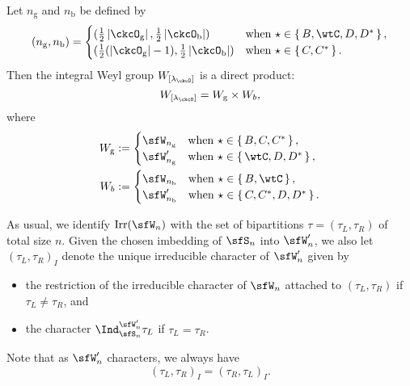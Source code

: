 \documentclass[12pt,a4paper]{amsart}
\def\abs#1{\left|{#1}\right|}
\newcommand{\g}{\mathfrak g}
\numberwithin{equation}{section}
\theoremstyle{remark}
\def\half{{\tfrac{1}{2}}}
\def\Irr{\mathrm{Irr}}
\def\lamck{\lambda_\ckcO}
\def\WLamck{W_{[\lambda_{\ckcO}]}}
\def\Wb{W_{b}}
\def\Wg{W_{\mathrm g}}
\begin{document}
Let $n_{\mathrm g}$ and $n_{\mathrm b}$ be defined by
  \begin{equation*}%
    (n_{\mathrm g},n_{\mathrm b}) =
    \begin{cases}
      (\half\abs{\ckcO_{\mathrm g}}, \half \abs{\ckcO_{\mathrm b}}) & \text{when
      } \star \in \set{B,\wtC,D,D^{*}},\\
      (\half(\abs{\ckcO_{\mathrm g}}-1), \half \abs{\ckcO_{\mathrm b}}) & \text{when
      } \star \in \set{C,C^{*}}.\\
          \end{cases}
  \end{equation*}
 Then the integral Weyl group $\WLamck$ is a direct product:
    \[
    W_{[\lamck]} =\Wg\times \Wb,
  \]
  where
  \begin{equation}\label{eq:Wbg}
    \begin{split}
    \Wg & := \begin{cases}
      \sfW_{n_{\mathrm g}}  & \text{when } \star \in \set{B,C, C^{*} }, \\
      \sfW'_{n_{\mathrm g}} & \text{when } \star \in \set{\wtC,D,D^{*}},\end{cases}\\
      \Wb & := \begin{cases}
      \sfW_{n_{\mathrm b}}  & \text{when } \star \in \set{B, \wtC}, \\
      \sfW'_{n_{\mathrm b}} & \text{when } \star \in \set{C,C^{*},D,D^{*}}.
      \end{cases}
    \end{split}
  \end{equation}

As usual, we identify $\Irr(\sfW_{n})$ with the set of bipartitions $\tau =(\tau_{L},\tau_{R})$ of total size $n$.
Given the chosen imbedding of $\sfS_{n}$ into $\sfW'_{n}$, we also let $(\tau_{L},\tau_{R})_{I}$ denote the unique irreducible character of $\sfW'_{n}$ given by
  \begin{itemize}
    \item the restriction of
    the irreducible character of $\sfW_{n}$ attached to $(\tau_{L},\tau_{R})$ if
    $\tau_{L}\neq \tau_{R}$, and
    \item
    the character
    $\Ind_{\sfS_{n}}^{\sfW'_{n}} \tau_{L}$ if $\tau_{L}=\tau_{R}$.
  \end{itemize}
  Note that as $\sfW'_{n}$ characters, we always have
  \[
    (\tau_{L},\tau_{R})_{I}=(\tau_{R},\tau_{L})_{I}.
  \]
\end{document}
